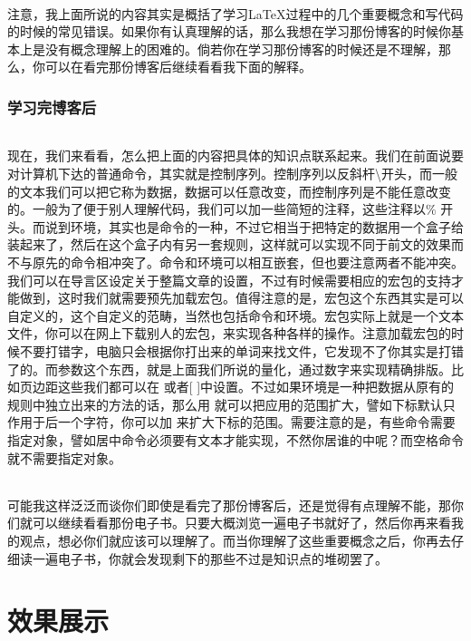 \documentclass[UTF8,11pt,titlepage,a4paper]{ctexart}
\begin{document}
   \paragraph*{}注意，我上面所说的内容其实是概括了学习LaTeX过程中的几个重要概念和写代码的时候的常见错误。如果你有认真理解的话，那么我想在学习那份博客的时候你基本上是没有概念理解上的困难的。倘若你在学习那份博客的时候还是不理解，那么，你可以在看完那份博客后继续看看我下面的解释。
   \par 
   \section{学习完博客后}
   \paragraph*{}现在，我们来看看，怎么把上面的内容把具体的知识点联系起来。我们在前面说要对计算机下达的普通命令，其实就是控制序列。控制序列以反斜杆\textbackslash 开头，而一般的文本我们可以把它称为数据，数据可以任意改变，而控制序列是不能任意改变的。一般为了便于别人理解代码，我们可以加一些简短的注释，这些注释以\% 开头。而说到环境，其实也是命令的一种，不过它相当于把特定的数据用一个盒子给装起来了，然后在这个盒子内有另一套规则，这样就可以实现不同于前文的效果而不与原先的命令相冲突了。命令和环境可以相互嵌套，但也要注意两者不能冲突。我们可以在导言区设定关于整篇文章的设置，不过有时候需要相应的宏包的支持才能做到，这时我们就需要预先加载宏包。值得注意的是，宏包这个东西其实是可以自定义的，这个自定义的范畴，当然也包括命令和环境。宏包实际上就是一个文本文件，你可以在网上下载别人的宏包，来实现各种各样的操作。注意加载宏包的时候不要打错字，电脑只会根据你打出来的单词来找文件，它发现不了你其实是打错了的。而参数这个东西，就是上面我们所说的量化，通过数字来实现精确排版。比如页边距这些我们都可以在{ }或者[ ]中设置。不过如果环境是一种把数据从原有的规则中独立出来的方法的话，那么用{ }就可以把应用的范围扩大，譬如下标默认只作用于后一个字符，你可以加{ }来扩大下标的范围。需要注意的是，有些命令需要指定对象，譬如居中命令必须要有文本才能实现，不然你居谁的中呢？而空格命令就不需要指定对象。
   \paragraph*{}可能我这样泛泛而谈你们即使是看完了那份博客后，还是觉得有点理解不能，那你们就可以继续看看那份电子书。只要大概浏览一遍电子书就好了，然后你再来看我的观点，想必你们就应该可以理解了。而当你理解了这些重要概念之后，你再去仔细读一遍电子书，你就会发现剩下的那些不过是知识点的堆砌罢了。
   \part{效果展示}
\end{document}
